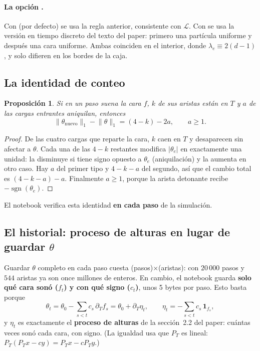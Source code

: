 \documentclass[11pt,a4paper]{article}
\theoremstyle{plain}
\newtheorem{proposicion}{Proposición}[section]
\theoremstyle{remark}
\newcommand{\fn}[1]{\texttt{\detokenize{#1}}}
\newcommand{\Lgen}{\mathcal{L}}
\DeclareMathOperator{\sgn}{sgn}
\newcommand{\norm}[1]{\lVert #1\rVert}
\begin{document}
\paragraph{La opción \fn{clock}.} Con \fn{"generator"} (por defecto) se usa la regla anterior, consistente con $\Lgen$. Con \fn{"per_particle"} se usa la versión en tiempo discreto del texto del paper: primero una partícula uniforme y después una cara uniforme. Ambas coinciden en el interior, donde $\lambda_e\equiv2(d-1)$, y solo difieren en los bordes de la caja.

\subsection{La identidad de conteo}

\begin{proposicion}\label{prop:conteo}
Si en un paso suena la cara $f$, $k$ de sus aristas están en $T$ y $a$ de las cargas entrantes aniquilan, entonces
\[
\norm{\theta_{\text{nuevo}}}_1-\norm{\theta}_1=(4-k)-2a,\qquad a\ge1 .
\]
\end{proposicion}

\begin{proof}
De las cuatro cargas que reparte la cara, $k$ caen en $T$ y desaparecen sin afectar a $\theta$. Cada una de las $4-k$ restantes modifica $|\theta_e|$ en exactamente una unidad: la disminuye si tiene signo opuesto a $\theta_e$ (aniquilación) y la aumenta en otro caso. Hay $a$ del primer tipo y $4-k-a$ del segundo, así que el cambio total es $(4-k-a)-a$. Finalmente $a\ge1$, porque la arista detonante recibe $-\sgn(\theta_e)$.
\end{proof}

El notebook verifica esta identidad \textbf{en cada paso} de la simulación.

\subsection{El historial: proceso de alturas en lugar de guardar \texorpdfstring{$\theta$}{theta}}

Guardar $\theta$ completo en cada paso cuesta (pasos)$\times$(aristas): con $20\,000$ pasos y $544$ aristas ya son once millones de enteros. En cambio, el notebook guarda \textbf{solo qué cara sonó ($f_t$) y con qué signo ($c_t$)}, unos 5 bytes por paso. Esto basta porque
\[
\theta_t=\theta_0-\sum_{s<t}c_s\,\partial_Tf_s=\theta_0+\partial_T\eta_t,\qquad
\eta_t=-\sum_{s<t}c_s\,\mathbf 1_{f_s},
\]
y $\eta_t$ es exactamente el \textbf{proceso de alturas} de la sección~2.2 del paper: cuántas veces sonó cada cara, con signo. (La igualdad usa que $P_T$ es lineal: $P_T(P_Tx-cy)=P_Tx-cP_Ty$.)
\end{document}

